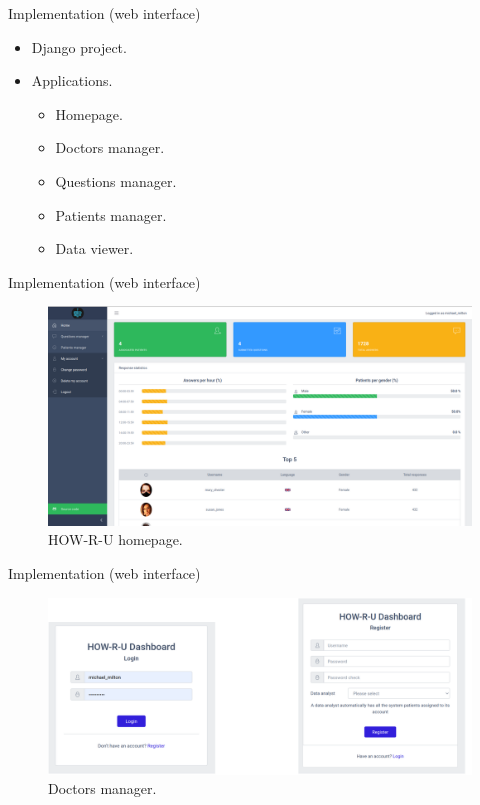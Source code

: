 \documentclass{beamer}
\begin{document}
\begin{frame}[fragile]{Implementation (web interface)}
  \begin{itemize}[<+->]
    \item Django \cite{django} project.
    \item Applications.
          \begin{itemize}[<+->]
            \item Homepage.
            \item Doctors manager.
            \item Questions manager.
            \item Patients manager.
            \item Data viewer.
          \end{itemize}
  \end{itemize}
\end{frame}

\begin{frame}[fragile]{Implementation (web interface)}
  \begin{figure}[H]
      \centering
      \includegraphics[width=\textwidth]{homepage.png}
      \caption{HOW-R-U homepage.}
  \end{figure}
\end{frame}
\begin{frame}[fragile]{Implementation (web interface)}
  \begin{figure}[H]
      \centering
      \includegraphics[width=\textwidth]{doctors_manager.png}
      \caption{Doctors manager.}
  \end{figure}
\end{frame}
\end{document}
